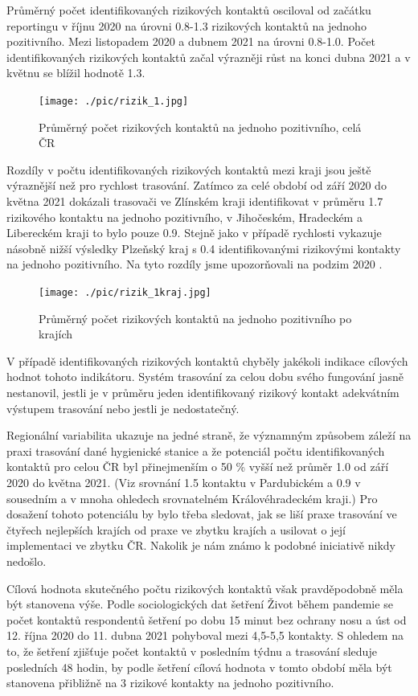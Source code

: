 Průměrný počet identifikovaných rizikových kontaktů osciloval od začátku reportingu v říjnu 2020 na úrovni 0.8-1.3 rizikových kontaktů na jednoho pozitivního. Mezi listopadem 2020 a dubnem 2021 na úrovni 0.8-1.0. Počet identifikovaných rizikových kontaktů začal výrazněji růst na konci dubna 2021 a v květnu se blížil hodnotě 1.3.

\begin{figure}[ht]
    \centering
    \texttt{[image: ./pic/rizik\_1.jpg]}
    \caption{Průměrný počet rizikových kontaktů na jednoho pozitivního, celá ČR}
    \label{fig:rizik1}
\end{figure}

Rozdíly v počtu identifikovaných rizikových kontaktů mezi kraji jsou ještě výraznější než pro rychlost trasování. Zatímco za celé období od září 2020 do května 2021 dokázali trasovači ve Zlínském kraji identifikovat v průměru 1.7 rizikového kontaktu na jednoho pozitivního, v Jihočeském, Hradeckém a Libereckém kraji to bylo pouze 0.9. Stejně jako v případě rychlosti vykazuje násobně nižší výsledky Plzeňský kraj s 0.4 identifikovanými rizikovými kontakty na jednoho pozitivního. Na tyto rozdíly jsme upozorňovali na podzim 2020 \cite{tr_bisop04}.

\begin{figure}[ht]
    \centering
    \texttt{[image: ./pic/rizik\_1kraj.jpg]}
    \caption{Průměrný počet rizikových kontaktů na jednoho pozitivního po krajích}
    \label{fig:rizik1kraj}
\end{figure}

V případě identifikovaných rizikových kontaktů chyběly jakékoli indikace cílových hodnot tohoto indikátoru. Systém trasování za celou dobu svého fungování jasně nestanovil, jestli je v průměru jeden identifikovaný rizikový kontakt adekvátním výstupem trasování nebo jestli je nedostatečný.

Regionální variabilita ukazuje na jedné straně, že významným způsobem záleží na praxi trasování dané hygienické stanice a že potenciál počtu identifikovaných kontaktů pro celou ČR byl přinejmenším o 50 \% vyšší než průměr 1.0 od září 2020 do května 2021. (Viz srovnání 1.5 kontaktu v Pardubickém a 0.9 v sousedním a v mnoha ohledech srovnatelném Královéhradeckém kraji.) Pro dosažení tohoto potenciálu by bylo třeba sledovat, jak se liší praxe trasování ve čtyřech nejlepších krajích od praxe ve zbytku krajích a usilovat o její implementaci ve zbytku ČR. Nakolik je nám známo k podobné iniciativě nikdy nedošlo.

Cílová hodnota skutečného počtu rizikových kontaktů však pravděpodobně měla být stanovena výše. Podle sociologických dat šetření Život během pandemie \cite{tr_PAQ01} se počet kontaktů respondentů šetření po dobu 15 minut bez ochrany nosu a úst od 12. října 2020 do 11. dubna 2021 pohyboval mezi 4,5-5,5 kontakty. S ohledem na to, že šetření zjišťuje počet kontaktů v posledním týdnu a trasování sleduje posledních 48 hodin, by podle šetření cílová hodnota v tomto období měla být stanovena přibližně na 3 rizikové kontakty na jednoho pozitivního.

